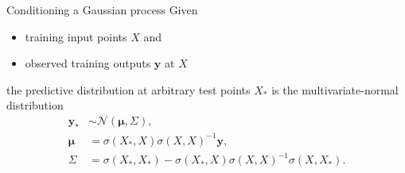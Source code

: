 \documentclass{beamer}
\newcommand{\y}{\mathbf y}
\begin{document}
\begin{frame}{Conditioning a Gaussian process}
  Given
  \begin{itemize}
    \item training input points $X$ and
    \item observed training outputs $\y$ at $X$
  \end{itemize}
  the predictive distribution at arbitrary test points $X_*$ is the multivariate-normal distribution
  \begin{align*}
    \y_* &\sim \mathcal N(\boldsymbol\mu, \Sigma), \\
    \boldsymbol\mu &= \sigma(X_*, X)\sigma(X, X)^{-1}\y, \\
    \Sigma &= \sigma(X_*,X_*) - \sigma(X_*,X)\sigma(X,X)^{-1}\sigma(X,X_*).
  \end{align*}
\end{frame}
\end{document}
